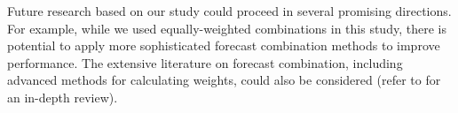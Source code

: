 \documentclass[a4paper,review,12pt,authoryear]{elsarticle}
\begin{document}
Future research based on our study could proceed in several promising directions. %
For example, while we used equally-weighted combinations in this study, there is  potential to apply more sophisticated forecast combination methods to improve performance. The extensive literature on forecast combination, including advanced methods for calculating weights, could also be considered (refer to \citealp{wangForecastCombinations50year2022} for an in-depth review).
\end{document}
